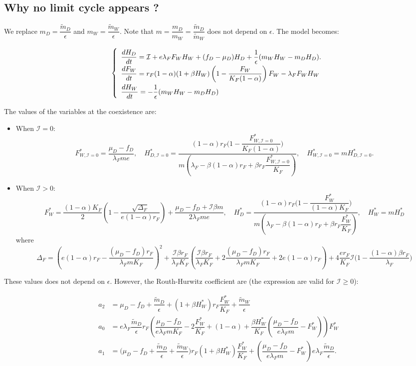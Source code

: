 \documentclass{article}
\newcommand{\lfw}{\lambda_{F}}
\newcommand{\lfw}{\lambda_{F}}
\newcommand{\cI}{\mathcal{I}}
\begin{document}
\subsection{Why no limit cycle appears ?}
We replace $m_D = \dfrac{\tilde m_D}{\epsilon}$ and $m_W = \dfrac{\tilde m _W}{\epsilon}$. Note that $m = \dfrac{m_D}{m_W} = \dfrac{\tilde m_D}{\tilde m_ W}$ does not depend on $\epsilon$. The model becomes:

\begin{equation}
\def\arraystretch{2}
\left\{ 
\begin{array}{l}
\dfrac{dH_D}{dt}= \cI + e \lfw F_W H_W + (f_D - \mu_D) H_D + \dfrac{1}{\epsilon}(m_W H_W - m_D H_D). \\
\dfrac{dF_W}{dt} = r_F(1- \alpha) (1+ \beta H_W) \left(1 - \dfrac{F_W}{K_F(1-\alpha)} \right) F_W - \lfw F_W H_W \\
\dfrac{dH_W}{dt}= - \dfrac{1}{\epsilon}(m_W H_W - m_D H_D)
\end{array} \right.
\end{equation}

The values of the variables at the coexistence are:

\begin{itemize}
\item When $\cI = 0$:
$$F^*_{W, \cI = 0} = \dfrac{\mu_D - f_D}{\lfw m e},
\quad 
H^*_{D, \cI = 0} = \dfrac{(1-\alpha)r_F\Big(1 - \dfrac{F^*_{W, \cI = 0}}{K_F(1-\alpha)} \Big)}{m\left(\lfw - \beta (1-\alpha) r_F + \beta r_F  \dfrac{F^*_{W, \cI = 0}}{K_F}\right)} ,
\quad 
H^*_{W, \cI = 0} = m H^*_{D, \cI = 0}.$$
\item When $\cI > 0$:
$$F^*_{W} = \dfrac{(1-\alpha)K_F}{2}\left(1 - \dfrac{\sqrt{\Delta_F}}{e(1-\alpha)r_F}\right) + \dfrac{\mu_D - f_D + \cI \beta m}{2\lfw m e},\quad
H^*_{D} = \dfrac{(1-\alpha)r_F\Big(1 - \dfrac{F^*_{W}}{(1-\alpha)K_F} \Big)}{m\left(\lfw - \beta (1-\alpha) r_F + \beta r_F  \dfrac{F^*_{W}}{K_F}\right)},
\quad 
H^*_{W} = m H^*_{D}$$
where
$$
\Delta_F = \left(e(1-\alpha)r_F - \dfrac{(\mu_D - f_D) r_F}{\lfw m K_F}\right)^2 + \dfrac{\cI \beta r_F}{\lfw K_F} \left(\dfrac{\cI \beta r_F}{\lfw K_F} + 2\dfrac{(\mu_D - f_D) r_F}{\lfw m K_F} + 2e(1-\alpha)r_F \right) + 4\dfrac{er_F}{K_F}  \cI\Big(1 - \dfrac{(1-\alpha)\beta r_F}{\lfw} \Big)
$$
\end{itemize}

These values does not depend on $\epsilon$. However, the Routh-Hurwitz coefficient are (the expression are valid for $\cI \geq 0$):

\begin{align*}
a_2  &= \mu_D - f_D + \dfrac{\tilde m_D}{\epsilon} + (1+\beta H_W^*)r_F \dfrac{F_W^*}{K_F} + \dfrac{\tilde m_W}{\epsilon} \\
a_0 &= e \lfw \dfrac{\tilde m_D}{\epsilon} r_F \left(\dfrac{\mu_D -f_D }{e \lfw m K_F} - 2\dfrac{F_W^*}{K_F} + (1-\alpha) + \dfrac{\beta H_W^*}{K_F} \left(\dfrac{\mu_D -f_D }{e \lfw m} - F_W^*\right) \right) F_W^* \\
a_1 &= \Big( \mu_D  -f_D + \dfrac{\tilde m_D}{\epsilon} + \dfrac{\tilde m_W}{\epsilon} \Big) r_F(1+ \beta H_W^*) \dfrac{F^*_W}{K_F} + \left(\dfrac{\mu_D -f_D}{e\lfw m} - F_W^*\right) e \lfw \dfrac{\tilde m_D}{\epsilon}.
\end{align*}
\end{document}
